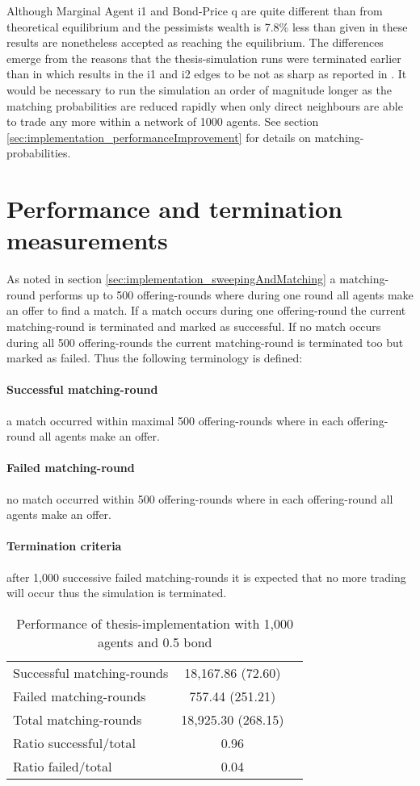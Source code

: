 \documentclass[Bachelorarbeit.tex]{subfiles}
\begin{document}
Although Marginal Agent i1 and Bond-Price q are quite different than from theoretical equilibrium and the pessimists wealth is 7.8\% less than given in \cite{Breuer2015} these results are nonetheless accepted as reaching the equilibrium. The differences emerge from the reasons that the thesis-simulation runs were terminated earlier than in \cite{Breuer2015} which results in the i1 and i2 edges to be not as sharp as reported in \cite{Breuer2015}. It would be necessary to run the simulation an order of magnitude longer as the matching probabilities are reduced rapidly when only direct neighbours are able to trade any more within a network of 1000 agents. See section \ref{sec:implementation_performanceImprovement} for details on matching-probabilities.

\section{Performance and termination measurements}
As noted in section \ref{sec:implementation_sweepingAndMatching} a matching-round performs up to 500 offering-rounds where during one round all agents make an offer to find a match. If a match occurs during one offering-round the current matching-round is terminated and marked as successful. If no match occurs during all 500 offering-rounds the current matching-round is terminated too but marked as failed. Thus the following terminology is defined:

\paragraph{Successful matching-round} a match occurred within maximal 500 offering-rounds where in each offering-round all agents make an offer.
\paragraph{Failed matching-round} no match occurred within 500 offering-rounds where in each offering-round all agents make an offer.
\paragraph{Termination criteria} after 1,000 successive failed matching-rounds it is expected that no more trading will occur thus the simulation is terminated.

\begin{table}[H]
	\centering
	\caption{Performance of thesis-implementation with 1,000 agents and 0.5 bond}
	\begin{tabular} { l c r }
		\hline
		Successful matching-rounds & 18,167.86 (72.60) \\
		Failed matching-rounds & 757.44 (251.21) \\
		Total matching-rounds & 18,925.30 (268.15) \\
		\hline
		Ratio successful/total & 0.96 \\
		Ratio failed/total & 0.04 \\
		\hline
	\end{tabular}
\end{table}
\end{document}
